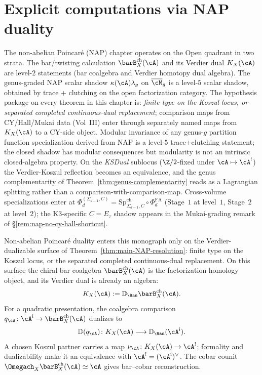 \chapter{Explicit computations via NAP duality}
\label{chap:NAP-computations}


\begin{remark}
\label{rem:nap-type-signature}
The non-abelian Poincar\'e (NAP) chapter operates on the Open quadrant
in two strata. The bar/twisting calculation
$\barB^{\mathrm{ch}}_X(\cA)$ and its Verdier dual
$K_X(\cA)$ are level-$2$ statements (bar coalgebra and Verdier
homotopy dual algebra). The genus-graded NAP scalar shadow
$\kappa(\cA)\lambda_g$ on $\overline{\cM}_g$ is a level-$5$ scalar
shadow, obtained by trace + clutching on the open factorization
category. The hypothesis package on every theorem in this chapter is:
\emph{finite type on the Koszul locus, or separated completed
continuous-dual replacement}; comparison maps from CY/Hall/Mukai data
\textup{(}Vol~III\textup{)} enter through separately named maps from
$K_X(\cA)$ to a CY-side object. Modular invariance of any
genus-$g$ partition function specialization derived from NAP is a
level-$5$ trace+clutching statement; the closed shadow has modular
consequences but modularity is not an intrinsic closed-algebra
property. On the \emph{KSDual} sublocus
($\Z/2$-fixed under $\cA\mapsto\cA^!$) the Verdier-Koszul reflection
becomes an equivalence, and the genus complementarity of
Theorem~\ref{thm:genus-complementarity} reads as a Lagrangian
splitting rather than a comparison-with-comparison-map.
Cross-volume specializations enter at
$\Phi_d^{(\Sigma_{d-1}, C)}=\mathrm{Sp}^{\mathrm{ch}}_{\Sigma_{d-1},C}\circ
\Phi_d^{\mathrm{FA}}$ (Stage~$1$ at level~$1$, Stage~$2$ at level~$2$);
the K3-specific $C=E_\tau$ shadow appears in the Mukai-grading remark
of \S\ref{rem:nap-no-cy-hall-shortcut}.
\end{remark}

Non-abelian Poincar\'e duality enters this monograph only on the
Verdier-dualizable surface of Theorem~\ref{thm:main-NAP-resolution}:
finite type on the Koszul locus, or the separated completed
continuous-dual replacement. On this surface the chiral bar coalgebra
$\barB_X^{\mathrm{ch}}(\cA)$ is the factorization homology object,
and its Verdier dual is already an algebra:
\[
K_X(\cA):=\mathbb{D}_{\Ran}\barB_X^{\mathrm{ch}}(\cA).
\]
For a quadratic presentation, the coalgebra comparison
$q_\cA\colon\cA^{\mathrm i}\to\barB_X^{\mathrm{ch}}(\cA)$ dualizes to
\[
\mathbb D(q_\cA)\colon K_X(\cA)\longrightarrow
\mathbb D_{\Ran}(\cA^{\mathrm i}).
\]
A chosen Koszul partner carries a map
$\nu_\cA\colon K_X(\cA)\to\cA^!$; formality and dualizability make it
an equivalence with $\cA^!=(\cA^{\mathrm i})^\vee$.  The cobar counit
$\Omegach_X\barB_X^{\mathrm{ch}}(\cA)\simeq\cA$ gives bar--cobar
reconstruction.

